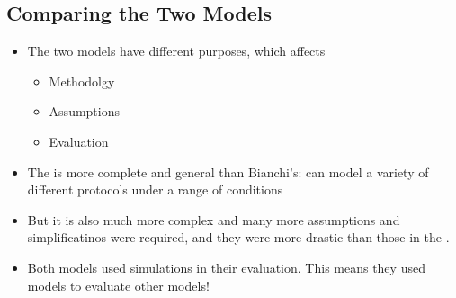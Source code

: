 \subsection{Comparing the Two Models}\label{subsec:Comparing_CSMA_Models}
\begin{itemize}[noitemsep]
\item The two models have different purposes, which affects
  \begin{itemize}[noitemsep]
  \item Methodolgy
  \item Assumptions
  \item Evaluation
\end{itemize}

\item The  is more complete and general than Bianchi’s: can model a variety of different protocols under a range of conditions
\item But it is also much more complex and many more assumptions and simplificatinos were required, and they were more drastic than those in the .
\item Both models used simulations in their evaluation. This means they used models to evaluate other models!
\end{itemize}

